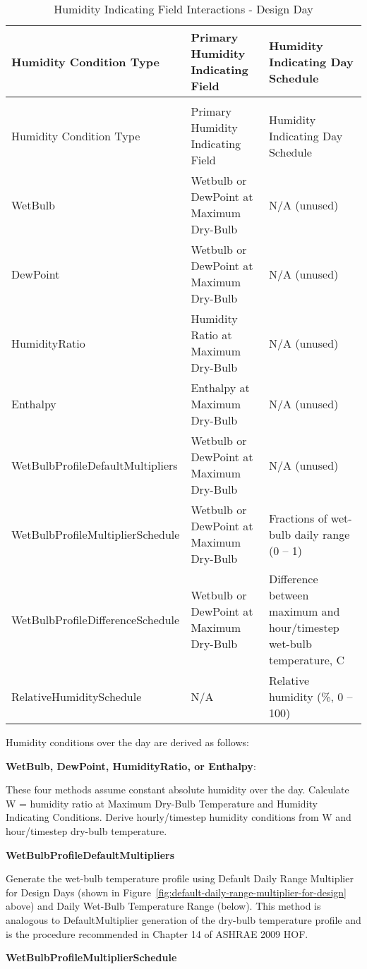 \begin{longtable}[c]{p{2.25in}p{1.75in}p{2.0in}}
\caption{Humidity Indicating Field Interactions - Design Day \label{table:humidity-indicating-field-interactions-design}} \tabularnewline
\toprule
Humidity Condition Type & Primary Humidity Indicating Field & Humidity Indicating Day Schedule \tabularnewline
\midrule
\endfirsthead

\caption[]{Humidity Indicating Field Interactions - Design Day} \tabularnewline
\toprule
Humidity Condition Type & Primary Humidity Indicating Field & Humidity Indicating Day Schedule \tabularnewline
\midrule
\endhead

WetBulb & Wetbulb or DewPoint at Maximum Dry-Bulb & N/A (unused) \tabularnewline
DewPoint & Wetbulb or DewPoint at Maximum Dry-Bulb & N/A (unused) \tabularnewline
HumidityRatio & Humidity Ratio at Maximum Dry-Bulb & N/A (unused) \tabularnewline
Enthalpy & Enthalpy at Maximum Dry-Bulb & N/A (unused) \tabularnewline
WetBulbProfile\-DefaultMultipliers & Wetbulb or DewPoint at Maximum Dry-Bulb & N/A (unused) \tabularnewline
WetBulbProfile\-MultiplierSchedule & Wetbulb or DewPoint at Maximum Dry-Bulb & Fractions of wet-bulb daily range (0 – 1) \tabularnewline
WetBulbProfile\-DifferenceSchedule & Wetbulb or DewPoint at Maximum Dry-Bulb & Difference between maximum and hour/timestep wet-bulb temperature, C \tabularnewline
RelativeHumidity\-Schedule & N/A & Relative humidity (\%, 0 – 100) \tabularnewline
\bottomrule
\end{longtable}

Humidity conditions over the day are derived as follows:

\textbf{WetBulb, DewPoint, HumidityRatio, or Enthalpy}:

These four methods assume constant absolute humidity over the day. Calculate W = humidity ratio at Maximum Dry-Bulb Temperature and Humidity Indicating Conditions. Derive hourly/timestep humidity conditions from W and hour/timestep dry-bulb temperature.

\textbf{WetBulbProfileDefaultMultipliers}

Generate the wet-bulb temperature profile using Default Daily Range Multiplier for Design Days (shown in Figure~\ref{fig:default-daily-range-multiplier-for-design} above) and Daily Wet-Bulb Temperature Range (below). This method is analogous to DefaultMultiplier generation of the dry-bulb temperature profile and is the procedure recommended in Chapter 14 of ASHRAE 2009 HOF.

\textbf{WetBulbProfileMultiplierSchedule}

